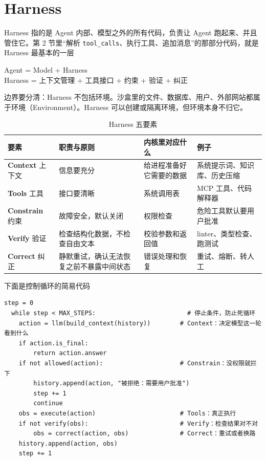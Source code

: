 \section{Harness}

Harness 指的是 Agent 内部、模型之外的所有代码，负责让 Agent 跑起来、并且管住它。第 2 节里“解析 \texttt{tool\_calls}、执行工具、追加消息”的那部分代码，就是 Harness 最基本的一层\\

\begin{tcolorbox}[enhanced, sharp corners, boxrule=0pt, frame hidden,
                  borderline west={3pt}{0pt}{structurecolor},
                  colback=structurecolor!5]
  Agent = Model + Harness\\
  Harness = 上下文管理 + 工具接口 + 约束 + 验证 + 纠正
\end{tcolorbox}

边界要分清：Harness 不包括环境。沙盒里的文件、数据库、用户、外部网站都属于环境（Environment）。Harness 可以创建或隔离环境，但环境本身不归它。

\begin{table}[htbp]
\centering
\caption{Harness 五要素}
\label{tab:harness}
\begin{tabular}{p{2.6cm} p{4.2cm} p{3.6cm} p{4.2cm}}
  \toprule
  要素 & 职责与原则 & 内核里对应什么 & 例子 \\
  \midrule
  \textbf{Context} 上下文   & 信息要充分 & 给进程准备好它需要的数据 & 系统提示词、知识库、历史压缩 \\
  \textbf{Tools} 工具       & 接口要清晰 & 系统调用表 & MCP 工具、代码解释器 \\
  \textbf{Constrain} 约束   & 故障安全，默认关闭 & 权限检查 & 危险工具默认要用户批准 \\
  \textbf{Verify} 验证      & 检查结构化数据，不检查自由文本 & 校验参数和返回值 & linter、类型检查、跑测试 \\
  \textbf{Correct} 纠正     & 静默重试，确认无法恢复之前不暴露中间状态 & 错误处理和恢复 & 重试、熔断、转人工 \\
  \bottomrule
\end{tabular}
\end{table}\newpage

下面是控制循环的简易代码
\begin{lstlisting}[style=agentpython, caption={控制循环}]
  step = 0
  while step < MAX_STEPS:                         # 停止条件，防止死循环
    action = llm(build_context(history))        # Context：决定模型这一轮看到什么
    if action.is_final:
        return action.answer
    if not allowed(action):                     # Constrain：没权限就拦下
        history.append(action, "被拒绝：需要用户批准")
        step += 1
        continue
    obs = execute(action)                       # Tools：真正执行
    if not verify(obs):                         # Verify：检查结果对不对
        obs = correct(action, obs)              # Correct：重试或者换路
    history.append(action, obs)
    step += 1
\end{lstlisting}

